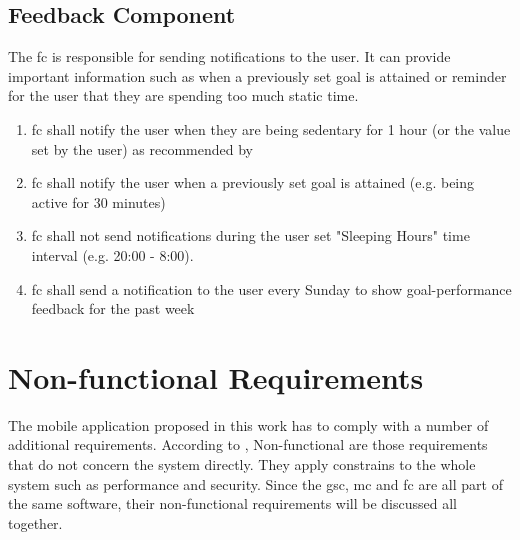     \subsection{Feedback Component}
    \label{section:feedback-component}
    The \gls{fc} is responsible for sending notifications to the user. It can provide important information such as when a previously set goal is attained or reminder for the user that they are spending too much static time.
    \begin{enumerate}
        \item \gls{fc} shall notify the user when they are being sedentary for 1 hour (or the value set by the user) as recommended by \citet[]{swartz2011}
        
        \item \gls{fc} shall notify the user when a previously set goal is attained (e.g. being active for 30 minutes)
        
        \item \gls{fc} shall not send notifications during the user set "Sleeping Hours" time interval (e.g. 20:00 - 8:00).
        
        \item \gls{fc} shall send a notification to the user every Sunday to show goal-performance feedback for the past week
           
    \end{enumerate}

\section{Non-functional Requirements}
The mobile application proposed in this work has to comply with a number of additional requirements. According to \citet[87]{sommerville2010}, Non-functional are those requirements that do not concern the system directly. They apply constrains to the whole system such as performance and security.  Since the \gls{gsc}, \gls{mc} and \gls{fc} are all part of the same software, their non-functional requirements will be discussed all together.
    
    
